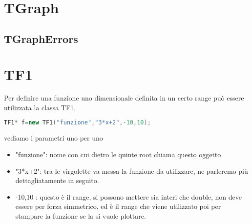 \section{TGraph}

\subsection{TGraphErrors}

\section{TF1}
Per definire una funzione uno dimensionale definita in un certo range può essere utilizzata la classa TF1.
\begin{lstlisting}[language=C++]
	TF1* f=new TF1("funzione","3*x+2",-10,10);
\end{lstlisting}
vediamo i parametri uno per uno
\begin{itemize}
	\item "funzione": nome con cui dietro le quinte root chiama questo oggetto
	\item "3*x+2": tra le virgolette va messa la funzione da utilizzare, ne parleremo più dettagliatamente in seguito.
	\item -10,10 : questo è il range, si possono mettere sia interi che double, non deve essere per forza simmetrico, ed è il range che viene utilizzato poi per stampare la funzione se la si vuole plottare.
\end{itemize}
